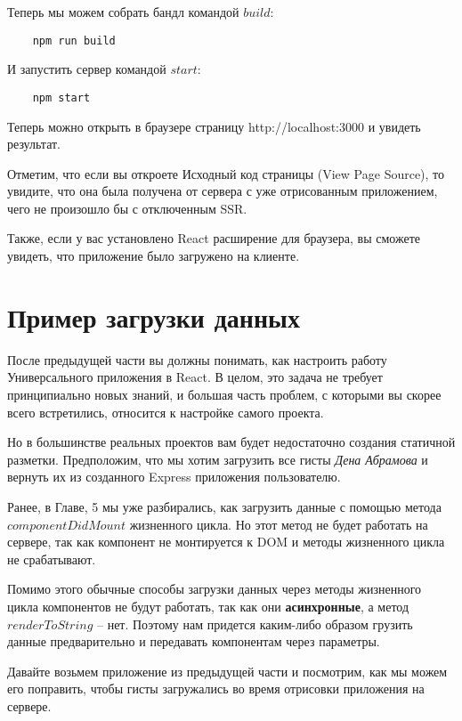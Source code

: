 Теперь мы можем собрать бандл командой $build$:

\begin{lstlisting}
	npm run build
\end{lstlisting}

И запустить сервер командой $start$:

\begin{lstlisting}
	npm start
\end{lstlisting}

Теперь можно открыть в браузере страницу http://localhost:3000 и увидеть результат.	

Отметим, что если вы откроете Исходный код страницы (View Page Source), то увидите, что она была получена от сервера с уже отрисованным приложением, чего не произошло бы с отключенным SSR.

Также, если у вас установлено React расширение для браузера, вы сможете увидеть, что приложение было загружено на клиенте.

\section{Пример загрузки данных}

После предыдущей части вы должны понимать, как настроить работу Универсального приложения в React. В целом, это задача не требует принципиально новых знаний, и большая часть проблем, с которыми вы скорее всего встретились, относится к настройке самого проекта.

Но в большинстве реальных проектов вам будет недостаточно создания статичной разметки. Предположим, что мы хотим загрузить все гисты \textit{Дена Абрамова} и вернуть их из созданного Express приложения пользователю.

Ранее, в Главе, 5 мы уже разбирались, как загрузить данные с помощью метода $componentDidMount$ жизненного цикла. Но этот метод не будет работать на сервере, так как компонент не монтируется к DOM и методы жизненного цикла не срабатывают.

Помимо этого обычные способы загрузки данных через методы жизненного цикла компонентов не будут работать, так как они \textbf{асинхронные}, а метод $renderToString$ -- нет. Поэтому нам придется каким-либо образом грузить данные предварительно и передавать компонентам через параметры.

Давайте возьмем приложение из предыдущей части и посмотрим, как мы можем его поправить, чтобы гисты загружались во время отрисовки приложения на сервере.

